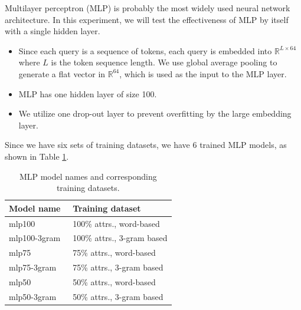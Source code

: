 \documentclass[conference]{IEEEtran}
\begin{document}

Multilayer perceptron (MLP) is probably the most widely used neural network architecture.  In this experiment, we will test the effectiveness of MLP by itself with a single hidden layer.


\begin{itemize}
    \item Since each query is a sequence of tokens, each query is embedded into
    $\mathbb{R}^{L\times 64}$ where $L$ is the token sequence length.  We use global
    average pooling to generate a flat vector in $\mathbb{R}^{64}$, which is used as the input to the MLP layer.
    \item MLP has one hidden layer of size 100.
    \item We utilize one drop-out layer to prevent overfitting by the large embedding layer.
\end{itemize}

Since we have six sets of training datasets, we have 6 trained MLP models, as shown in Table \ref{tab:trained_mlp_models}.
\begin{table}[!th]
	\centering
	\begin{tabularx}{0.8\textwidth}{|l|X|}
		\hline
		\textbf{Model name} & \textbf{Training dataset} \\ \hline
		mlp100 & 100\% attrs., word-based \\
		mlp100-3gram\ & 100\% attrs., 3-gram based \\ 
		mlp75 & 75\% attrs., word-based \\
		mlp75-3gram & 75\% attrs., 3-gram based \\ 
		mlp50 & 50\% attrs., word-based \\
		mlp50-3gram & 50\% attrs., 3-gram based \\ 
		\hline
	\end{tabularx}
	\caption{MLP model names and corresponding training datasets.}
	\label{tab:trained_mlp_models}
\end{table}

\end{document}
